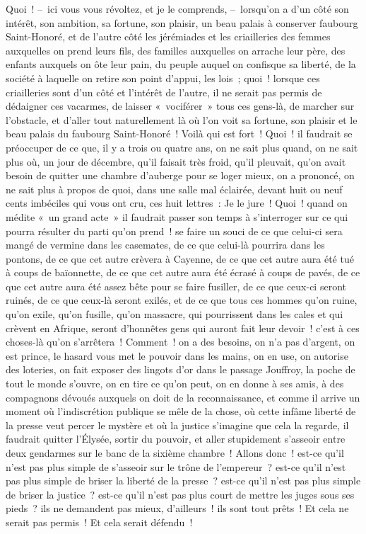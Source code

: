 \documentclass[french,twoside]{book} %
\begin{document}
Quoi ! – ici vous vous révoltez, et je le comprends, – lorsqu’on a d’un côté son intérêt, son ambition, sa fortune, son plaisir, un beau palais à conserver faubourg Saint-Honoré, et de l’autre côté les jérémiades et les criailleries des femmes auxquelles on prend leurs fils, des familles auxquelles on arrache leur père, des enfants auxquels on ôte leur pain, du peuple auquel on confisque sa liberté, de la société à laquelle on retire son point d’appui, les lois ; quoi ! lorsque ces criailleries sont d’un côté et l’intérêt de l’autre, il ne serait pas permis de dédaigner ces vacarmes, de laisser « vociférer » tous ces gens-là, de marcher sur l’obstacle, et d’aller tout naturellement là où l’on voit sa fortune, son plaisir et le beau palais du faubourg Saint-Honoré ! Voilà qui est fort ! Quoi ! il faudrait se préoccuper de ce que, il y a trois ou quatre ans, on ne sait plus quand, on ne sait plus où, un jour de décembre, qu’il faisait très froid, qu’il pleuvait, qu’on avait besoin de quitter une chambre d’auberge pour se loger mieux, on a prononcé, on ne sait plus à propos de quoi, dans une salle mal éclairée, devant huit ou neuf cents imbéciles qui vous ont cru, ces huit lettres : Je le jure ! Quoi ! quand on médite « un grand acte » il faudrait passer son temps à s’interroger sur ce qui pourra résulter du parti qu’on prend ! se faire un souci de ce que celui-ci sera mangé de vermine dans les casemates, de ce que celui-là pourrira dans les pontons, de ce que cet autre crèvera à Cayenne, de ce que cet autre aura été tué à coups de baïonnette, de ce que cet autre aura été écrasé à coups de pavés, de ce que cet autre aura été assez bête pour se faire fusiller, de ce que ceux-ci seront ruinés, de ce que ceux-là seront exilés, et de ce que tous ces hommes qu’on ruine, qu’on exile, qu’on fusille, qu’on massacre, qui pourrissent dans les cales et qui crèvent en Afrique, seront d’honnêtes gens qui auront fait leur devoir ! c’est à ces choses-là qu’on s’arrêtera ! Comment ! on a des besoins, on n’a pas d’argent, on est prince, le hasard vous met le pouvoir dans les mains, on en use, on autorise des loteries, on fait exposer des lingots d’or dans le passage Jouffroy, la poche de tout le monde s’ouvre, on en tire ce qu’on peut, on en donne à ses amis, à des compagnons dévoués auxquels on doit de la reconnaissance, et comme il arrive un moment où l’indiscrétion publique se mêle de la chose, où cette infâme liberté de la presse veut percer le mystère et où la justice s’imagine que cela la regarde, il faudrait quitter l’Élysée, sortir du pouvoir, et aller stupidement s’asseoir entre deux gendarmes sur le banc de la sixième chambre ! Allons donc ! est-ce qu’il n’est pas plus simple de s’asseoir sur le trône de l’empereur ? est-ce qu’il n’est pas plus simple de briser la liberté de la presse ? est-ce qu’il n’est pas plus simple de briser la justice ? est-ce qu’il n’est pas plus court de mettre les juges sous ses pieds ? ils ne demandent pas mieux, d’ailleurs ! ils sont tout prêts ! Et cela ne serait pas permis ! Et cela serait défendu !\par
\end{document}
